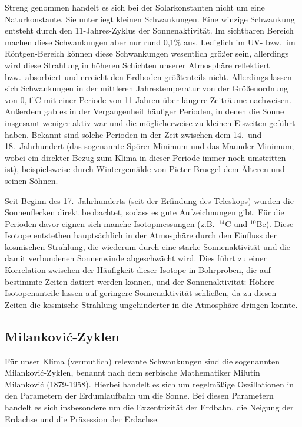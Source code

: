 Streng genommen handelt es sich bei der Solarkonstanten nicht um eine Naturkonstante. Sie unterliegt
kleinen Schwankungen. Eine winzige Schwankung entsteht durch den 11-Jahres-Zyklus der 
Sonnenaktivit\"at. Im sichtbaren Bereich machen diese Schwankungen aber nur rund 0,1\% aus. Lediglich
im UV- bzw.\ im R\"ontgen-Bereich k\"onnen diese Schwankungen wesentlich gr\"o\ss er sein, allerdings
wird diese Strahlung in h\"oheren Schichten unserer Atmosph\"are reflektiert bzw.\ absorbiert und 
erreicht den Erdboden gr\"o\ss tenteils nicht. Allerdings lassen sich Schwankungen in
der mittleren Jahrestemperatur von der Gr\"o\ss enordnung von $0,1^\circ$C mit einer Periode von 11
Jahren \"uber l\"angere Zeitr\"aume nachweisen. 
Au\ss erdem gab es in der Vergangenheit h\"aufiger Perioden, in denen die Sonne
insgesamt weniger aktiv war und die m\"oglicherweise zu kleinen Eiszeiten gef\"uhrt haben. Bekannt sind solche
Perioden in der Zeit zwischen dem 14.\ und 18.\ Jahrhundert (das sogenannte Sp\"orer-Minimum und das
Maunder-Minimum; wobei ein direkter Bezug zum Klima in dieser Periode immer noch umstritten ist), 
beispielsweise durch Wintergem\"alde von 
Pieter Bruegel dem \"Alteren und seinen S\"ohnen. 

Seit Beginn des 17.\ Jahrhunderts (seit der Erfindung des
Teleskops) wurden die Sonnenflecken direkt beobachtet, sodass es gute Aufzeichnungen
gibt. F\"ur die Perioden davor eignen sich manche Isotopmessungen (z.B.\ ${}^{14}$C und ${}^{10}$Be).
Diese Isotope entstethen haupts\"achlich in der Atmosph\"are durch den Einfluss der kosmischen Strahlung, 
die wiederum durch eine starke Sonnenaktivit\"at und die damit verbundenen Sonnenwinde 
abgeschw\"acht wird. Dies f\"uhrt zu einer Korrelation zwischen der H\"aufigkeit dieser Isotope in
Bohrproben, die auf bestimmte Zeiten datiert werden k\"onnen, und der Sonnenaktivit\"at: H\"ohere
Isotopenanteile lassen auf geringere Sonnenaktivit\"at schlie\ss en, da zu diesen Zeiten die kosmische
Strahlung ungehinderter in die Atmosph\"are dringen konnte.

\subsection{Milankovi\'c-Zyklen}

F\"ur unser Klima (vermutlich)
relevante Schwankungen sind die sogenannten Milankovi\'c-Zyklen, benannt nach
dem serbische Mathematiker Milutin Milankovi\'c (1879-1958). Hierbei handelt es sich um regelm\"a\ss ige
Oszillationen in den Parametern der Erdumlaufbahn um die Sonne. Bei diesen Parametern handelt
es sich insbesondere um die Exzentrizit\"at der Erdbahn, die Neigung der Erdachse und die
Pr\"azession der Erdachse.

